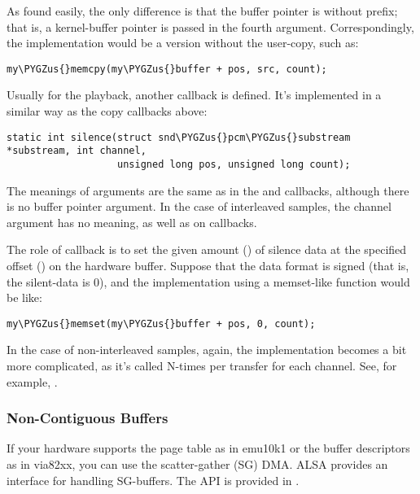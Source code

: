 \documentclass[a4paper,8pt,english]{sphinxmanual}
\def\PYGZus{\char`\_}
\begin{document}
As found easily, the only difference is that the buffer pointer is
without  prefix; that is, a kernel-buffer pointer is passed
in the fourth argument.  Correspondingly, the implementation would be
a version without the user-copy, such as:

\begin{Verbatim}[commandchars=\\\{\}]
my\PYGZus{}memcpy(my\PYGZus{}buffer + pos, src, count);
\end{Verbatim}

Usually for the playback, another callback  is
defined.  It's implemented in a similar way as the copy callbacks
above:

\begin{Verbatim}[commandchars=\\\{\}]
static int silence(struct snd\PYGZus{}pcm\PYGZus{}substream *substream, int channel,
                   unsigned long pos, unsigned long count);
\end{Verbatim}

The meanings of arguments are the same as in the  and
 callbacks, although there is no buffer pointer
argument. In the case of interleaved samples, the channel argument has
no meaning, as well as on  callbacks.

The role of  callback is to set the given amount
() of silence data at the specified offset () on the
hardware buffer. Suppose that the data format is signed (that is, the
silent-data is 0), and the implementation using a memset-like function
would be like:

\begin{Verbatim}[commandchars=\\\{\}]
my\PYGZus{}memset(my\PYGZus{}buffer + pos, 0, count);
\end{Verbatim}

In the case of non-interleaved samples, again, the implementation
becomes a bit more complicated, as it's called N-times per transfer
for each channel. See, for example, .


\subsubsection{Non-Contiguous Buffers}
\label{sound/kernel-api/writing-an-alsa-driver:non-contiguous-buffers}
If your hardware supports the page table as in emu10k1 or the buffer
descriptors as in via82xx, you can use the scatter-gather (SG) DMA. ALSA
provides an interface for handling SG-buffers. The API is provided in
.
\end{document}
